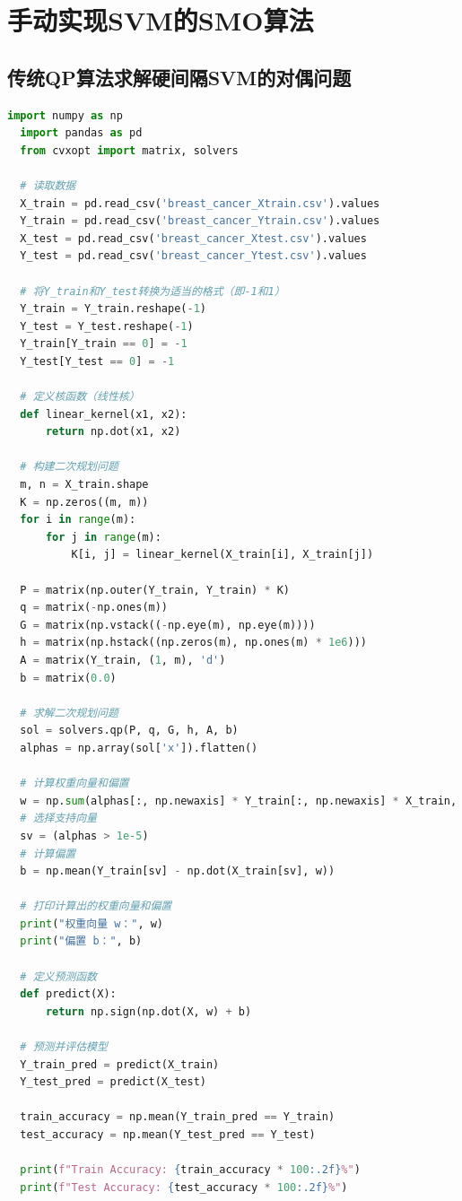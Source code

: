 \documentclass[12pt]{article}
\begin{document}
\newpage
\appendix
\section{手动实现SVM的SMO算法}
\subsection{传统QP算法求解硬间隔SVM的对偶问题}
\begin{lstlisting}[language=Python]
  import numpy as np
  import pandas as pd
  from cvxopt import matrix, solvers
  
  # 读取数据
  X_train = pd.read_csv('breast_cancer_Xtrain.csv').values
  Y_train = pd.read_csv('breast_cancer_Ytrain.csv').values
  X_test = pd.read_csv('breast_cancer_Xtest.csv').values
  Y_test = pd.read_csv('breast_cancer_Ytest.csv').values
  
  # 将Y_train和Y_test转换为适当的格式（即-1和1）
  Y_train = Y_train.reshape(-1)
  Y_test = Y_test.reshape(-1)
  Y_train[Y_train == 0] = -1
  Y_test[Y_test == 0] = -1
  
  # 定义核函数（线性核）
  def linear_kernel(x1, x2):
      return np.dot(x1, x2)
  
  # 构建二次规划问题
  m, n = X_train.shape
  K = np.zeros((m, m))
  for i in range(m):
      for j in range(m):
          K[i, j] = linear_kernel(X_train[i], X_train[j])
  
  P = matrix(np.outer(Y_train, Y_train) * K)
  q = matrix(-np.ones(m))
  G = matrix(np.vstack((-np.eye(m), np.eye(m))))
  h = matrix(np.hstack((np.zeros(m), np.ones(m) * 1e6)))
  A = matrix(Y_train, (1, m), 'd')
  b = matrix(0.0)
  
  # 求解二次规划问题
  sol = solvers.qp(P, q, G, h, A, b)
  alphas = np.array(sol['x']).flatten()
  
  # 计算权重向量和偏置
  w = np.sum(alphas[:, np.newaxis] * Y_train[:, np.newaxis] * X_train, axis=0)
  # 选择支持向量
  sv = (alphas > 1e-5)
  # 计算偏置
  b = np.mean(Y_train[sv] - np.dot(X_train[sv], w))
  
  # 打印计算出的权重向量和偏置
  print("权重向量 w：", w)
  print("偏置 b：", b)
  
  # 定义预测函数
  def predict(X):
      return np.sign(np.dot(X, w) + b)
  
  # 预测并评估模型
  Y_train_pred = predict(X_train)
  Y_test_pred = predict(X_test)
  
  train_accuracy = np.mean(Y_train_pred == Y_train)
  test_accuracy = np.mean(Y_test_pred == Y_test)
  
  print(f"Train Accuracy: {train_accuracy * 100:.2f}%")
  print(f"Test Accuracy: {test_accuracy * 100:.2f}%")
  
\end{lstlisting}
\end{document}
